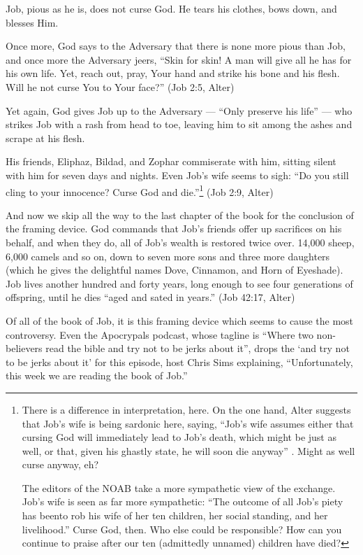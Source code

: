 Job, pious as he is, does not curse God. He tears his clothes, bows down, and blesses Him.

Once more, God says to the Adversary that there is none more pious than Job, and once more the Adversary jeers, ``Skin for skin! A man will give all he has for his own life. Yet, reach out, pray, Your hand and strike his bone and his flesh. Will he not curse You to Your face?'' (Job 2:5, Alter)

Yet again, God gives Job up to the Adversary --- ``Only preserve his life'' --- who strikes Job with a rash from head to toe, leaving him to sit among the ashes and scrape at his flesh.

His friends, Eliphaz, Bildad, and Zophar commiserate with him, sitting silent with him for seven days and nights. Even Job's wife seems to sigh: ``Do you still cling to your innocence? Curse God and die.''\footnote{There is a difference in interpretation, here. On the one hand, Alter suggests that Job's wife is being sardonic here, saying, ``Job's wife assumes either that cursing God will immediately lead to Job's death, which might be just as well, or that, given his ghastly state, he will soon die anyway'' \parencite[469]{alter}. Might as well curse anyway, eh?

  The editors of the NOAB take a more sympathetic view of the exchange. Job's wife is seen as far more sympathetic: ``The outcome of all Job's piety has beento rob his wife of her ten children, her social standing, and her livelihood.'' \parencite[737]{noab} Curse God, then. Who else could be responsible? How can you continue to praise after our ten (admittedly unnamed) children have died?} (Job 2:9, Alter)

And now we skip all the way to the last chapter of the book for the conclusion of the framing device. God commands that Job's friends offer up sacrifices on his behalf, and when they do, all of Job's wealth is restored twice over. 14,000 sheep, 6,000 camels and so on, down to seven more sons and three more daughters (which he gives the delightful names Dove, Cinnamon, and Horn of Eyeshade). Job lives another hundred and forty years, long enough to see four generations of offspring, until he dies ``aged and sated in years.'' (Job 42:17, Alter)

Of all of the book of Job, it is this framing device which seems to cause the most controversy. Even the Apocrypals podcast, whose tagline is ``Where two non-believers read the bible and try not to be jerks about it'', drops the `and try not to be jerks about it' for this episode, host Chris Sims explaining, ``Unfortunately, this week we are reading the book of Job.'' \parencite{apocrypals}

